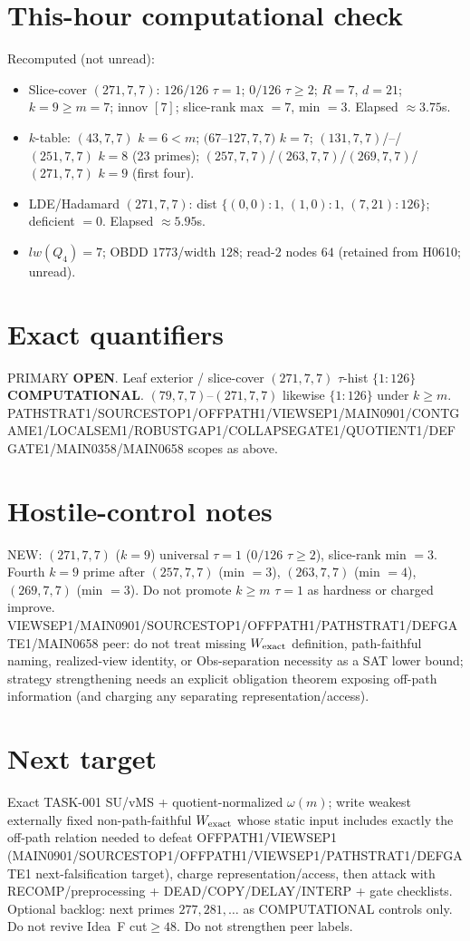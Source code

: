\documentclass[11pt]{article}
\begin{document}
\section*{This-hour computational check}
Recomputed (not unread):
\begin{itemize}
\item Slice-cover $(271,7,7)$: $126/126$ $\tau{=}1$; $0/126$ $\tau{\ge}2$; $R{=}7$, $d{=}21$;
  $k{=}9{\ge}m{=}7$; innov $[7]$; slice-rank max $=7$, min $=3$. Elapsed $\approx3.75$s.
\item $k$-table: $(43,7,7)$ $k{=}6{<}m$; $(67$--$127,7,7)$ $k{=}7$;
  $(131,7,7)$/--/$(251,7,7)$ $k{=}8$ (23 primes); $(257,7,7)$/$(263,7,7)$/$(269,7,7)$/$(271,7,7)$ $k{=}9$ (first four).
\item LDE/Hadamard $(271,7,7)$: dist $\{(0,0){:}1,\,(1,0){:}1,\,(7,21){:}126\}$; deficient $=0$. Elapsed $\approx5.95$s.
\item $lw(Q_4)=7$; OBDD $1773$/width $128$; read-$2$ nodes $64$ (retained from H0610; unread).
\end{itemize}

\section*{Exact quantifiers}
PRIMARY \textbf{OPEN}. Leaf exterior / slice-cover $(271,7,7)$ $\tau$-hist $\{1{:}126\}$ \textbf{COMPUTATIONAL}.
$(79,7,7)$--$(271,7,7)$ likewise $\{1{:}126\}$ under $k{\ge}m$.
PATHSTRAT1/SOURCESTOP1/OFFPATH1/VIEWSEP1/MAIN0901/CONTGAME1/LOCALSEM1/ROBUSTGAP1/COLLAPSEGATE1/QUOTIENT1/DEFGATE1/MAIN0358/MAIN0658 scopes as above.

\section*{Hostile-control notes}
NEW: $(271,7,7)$ ($k{=}9$) universal $\tau{=}1$ ($0/126$ $\tau{\ge}2$), slice-rank min $=3$.
Fourth $k{=}9$ prime after $(257,7,7)$ (min $=3$), $(263,7,7)$ (min $=4$), $(269,7,7)$ (min $=3$).
Do not promote $k{\ge}m$ $\tau{=}1$ as hardness or charged improve.
VIEWSEP1/MAIN0901/SOURCESTOP1/OFFPATH1/PATHSTRAT1/DEFGATE1/MAIN0658 peer: do not treat missing $W_{\rm exact}$ definition,
path-faithful naming, realized-view identity, or Obs-separation necessity as a SAT lower bound;
strategy strengthening needs an explicit obligation theorem exposing off-path information
(and charging any separating representation/access).

\section*{Next target}
Exact TASK-001 SU/vMS + quotient-normalized $\omega(m)$; write weakest externally fixed non-path-faithful
$W_{\rm exact}$ whose static input includes exactly the off-path relation needed to defeat OFFPATH1/VIEWSEP1
(MAIN0901/SOURCESTOP1/OFFPATH1/VIEWSEP1/PATHSTRAT1/DEFGATE1 next-falsification target), charge representation/access,
then attack with RECOMP/preprocessing + DEAD/COPY/DELAY/INTERP + gate checklists.
Optional backlog: next primes $277,281,\ldots$ as COMPUTATIONAL controls only.
Do not revive Idea~F cut$\ge48$. Do not strengthen peer labels.
\end{document}
